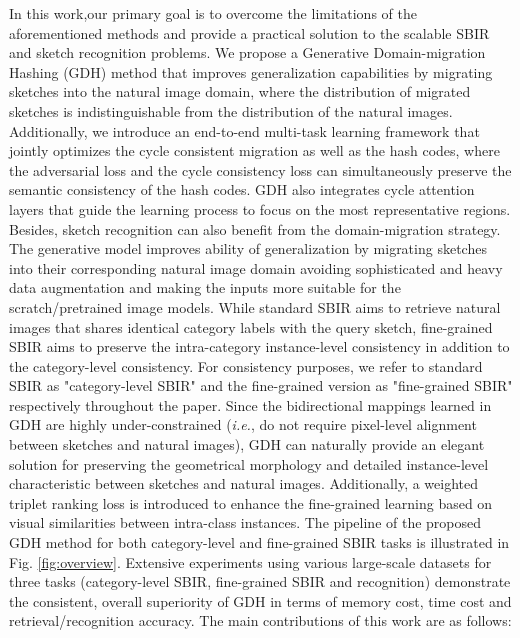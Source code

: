 In this work,our primary goal is to overcome the limitations of the aforementioned methods and provide a practical 
solution to the scalable SBIR and sketch recognition problems.
We propose a Generative Domain-migration Hashing (GDH) method that improves generalization capabilities 
by migrating sketches into the natural image domain, 
where the distribution of migrated sketches is indistinguishable from the distribution of the natural images. Additionally, 
we introduce an end-to-end multi-task learning framework that jointly optimizes 
the cycle consistent migration as well as the hash codes, where the adversarial 
loss and the cycle consistency loss can simultaneously preserve the semantic consistency of the hash codes. 
GDH also integrates cycle attention layers that guide the learning process to focus on the most representative regions.
Besides, sketch recognition can also benefit from the domain-migration strategy. 
The generative model improves ability of generalization by migrating sketches into 
their corresponding natural image domain avoiding sophisticated and heavy data augmentation 
and making the inputs more suitable for the scratch/pretrained image models.
While standard SBIR aims to retrieve natural images that shares identical category 
labels with the query sketch, fine-grained SBIR aims to preserve the intra-category 
instance-level consistency in addition to the category-level consistency. For 
consistency purposes, we refer to standard SBIR as "category-level SBIR" and the 
fine-grained version as "fine-grained SBIR" respectively throughout the paper. 
Since the bidirectional mappings learned in GDH are highly under-constrained 
(\emph{i.e.}, do not require pixel-level alignment \cite{IsolaZZE17} between 
sketches and natural images), GDH can naturally provide an elegant solution 
for preserving the geometrical morphology and detailed instance-level characteristic 
between sketches and natural images. Additionally, a weighted triplet ranking loss is introduced 
to enhance the fine-grained learning based on visual similarities between intra-class instances.
The pipeline of the proposed GDH method for both category-level and fine-grained SBIR tasks
is illustrated in Fig. \ref{fig:overview}. 
Extensive experiments using various large-scale datasets for three tasks (category-level SBIR,
fine-grained SBIR and recognition) demonstrate the consistent, overall superiority
of GDH in terms of memory cost, time cost and retrieval/recognition accuracy. 
The main contributions of this work are as follows:


